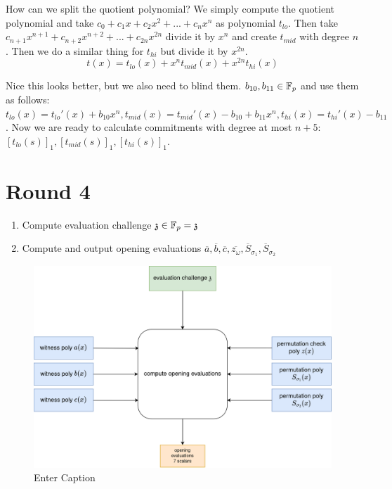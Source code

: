 How can we split the quotient polynomial? We simply compute the quotient polynomial and take $c_0 + c_1x + c_2x^2 + ... + c_n x^n $ as polynomial $t_{lo}$. Then take $c_{n+1}x^{n+1} + c_{n+2}x^{n+2} + ... + c_{2n}x^{2n}$ divide it by $x^n$ and create $t_{mid}$ with degree $n$. Then we do a similar thing for $t_{hi}$ but divide it by $x^{2n}$.
$$t(x) = t_{lo}(x) + x^n t_{mid}(x) + x^{2n}t_{hi}(x)$$

Nice this looks better, but we also need to blind them. $b_{10}, b_{11} \in \mathbb{F}_p$ and use them as follows: $t_{lo}(x) = t_{lo}'(x) + b_{10}x^n , t_{mid}(x) = t_{mid}'(x) - b_{10} + b_{11}x^n, t_{hi}(x) = t_{hi}'(x) - b_{11}$. Now we are ready to calculate commitments with degree at most $n+5$: $[t_{lo}(s)]_1, [t_{mid}(s)]_1, [t_{hi}(s)]_1$.


\section{Round 4}
\label{chap:round4}

\begin{enumerate}
    \item Compute evaluation challenge $\mathfrak{z} \in \mathbb{F}_p = \mathfrak{z}$
    \item Compute and output opening evaluations $\overline{a}, \overline{b}, \overline{c}, \overline{z_\omega}, \overline{S}_{\sigma_1}, \overline{S}_{\sigma_2}$
\end{enumerate}

\begin{figure}[H]
    \centering
    \includegraphics[width=1\linewidth]{round-figures/round4/round4.drawio.png}
    \caption{Enter Caption}
    
\end{figure}

